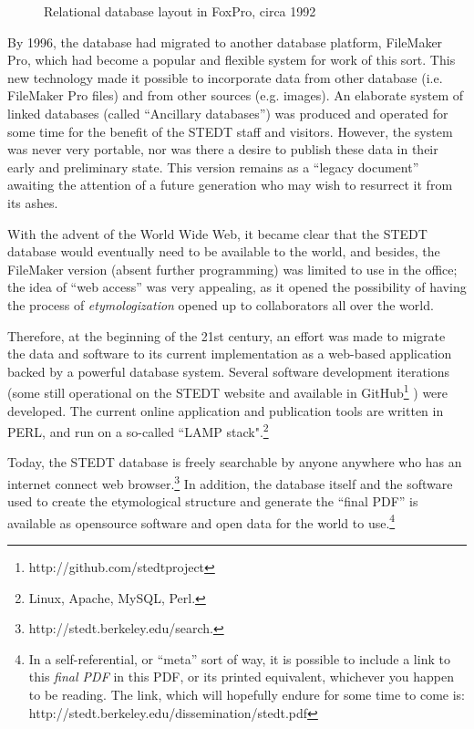 \begin{figure}[ht]
\centering
{}
\caption{Relational database layout in FoxPro, circa 1992}
\label{fig:foxpro}
\end{figure}


By 1996, the database had migrated to another database platform,
FileMaker Pro\texttrademark, which had become a popular and flexible system for work
of this sort.   This new technology made it possible to incorporate
data from other database (i.e. FileMaker Pro files) and from other
sources (e.g. images). An elaborate system of linked databases (called
``Ancillary databases'') was produced and operated for some time for
the benefit of the STEDT staff and visitors. However, the system was
never very portable, nor was there a desire to publish these data in
their early and preliminary state. This version remains as a ``legacy
document'' awaiting the attention of a future generation who may wish
to resurrect it from its ashes.

With the advent of the World Wide Web, it became clear that
the STEDT database would eventually need to be available to the world,
and besides, the FileMaker version (absent further programming) was
limited to use in the office; the idea of ``web access'' was very
appealing, as it opened the possibility of having the process of {\it etymologization}
opened up to collaborators all over the world.

Therefore, at the beginning of the 21st century, an effort was made to
migrate the data and software to its current implementation as a
web-based application backed by a powerful database system.  Several
software development iterations (some still operational on the STEDT
website and available in GitHub\footnote{http://github.com/stedtproject} ) were developed.   
The current online application and publication tools are written in PERL,
and run on a so-called ``LAMP stack".\footnote{Linux, Apache, MySQL, Perl.}

Today, the STEDT database is freely searchable by anyone anywhere who has
an internet connect web browser.\footnote{http://stedt.berkeley.edu/search.}
In addition, the database itself and
the software used to create the etymological structure and generate
the ``final PDF'' is available as opensource software and open data for the world to
use.\footnote{In a self-referential, or ``meta'' sort of way, it is
  possible to include a link to this {\it final PDF} in this PDF, or
  its printed equivalent, whichever you happen to be reading. The
  link, which will hopefully endure for some time to come is: http://stedt.berkeley.edu/dissemination/stedt.pdf}



